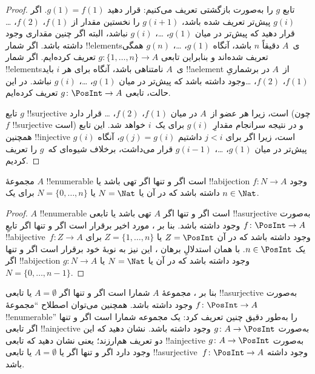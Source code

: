 \documentclass[../../../include/open-logic-section]{subfiles}
\begin{document}
\begin{proof}
  تابع $g$ را به‌صورت بازگشتی تعریف می‌کنیم: قرار دهید $g(1) = f(1)$.
  اگر $g(i)$ پیش‌تر تعریف شده باشد، $g(i+1)$ را نخستین مقدار از $f(1)$،
  $f(2)$، \dots{} قرار دهید که پیش‌تر در میان $g(1)$، \dots، $g(i)$
  نباشد، البته اگر چنین مقداری وجود داشته باشد. اگر شمار !!{element}sی~$A$
  دقیقاً $n$ باشد، آنگاه $g(1)$، \dots، $g(n)$ همگی تعریف شده‌اند
  و بنابراین تابعی $g\colon \{1, \dots, n\}
  \to A$ تعریف کرده‌ایم. اگر شمار !!{element}sی~$A$ نامتناهی باشد، آنگاه برای هر $i$ باید
  !!a{element} از~$A$ در برشماریِ $f(1)$، $f(2)$، \dots وجود داشته باشد
  که پیش‌تر در میان $g(1)$، \dots، $g(i)$ نباشد. در این حالت، تابعی
  $g\colon \PosInt \to A$ تعریف کرده‌ایم.

  تابع $g$ !!{surjective} است، زیرا هر عضو از~$A$ در میان $f(1)$،
  $f(2)$، \dots{} قرار دارد (چون $f$ !!{surjective} است) و در نتیجه سرانجام
  مقدارِ~$g(i)$ برای یک~$i$ خواهد شد. این تابع همچنین !!{injective} است،
  زیرا اگر برای $j < i$ داشتیم $g(j) = g(i)$، آنگاه $g(i)$ پیش‌تر
  در میان $g(1)$، \dots، $g(i-1)$ قرار می‌داشت، برخلاف شیوه‌ای که~$g$
  را تعریف کردیم.
\end{proof}

\begin{cor}
مجموعهٔ $A$ !!{enumerable} است اگر و تنها اگر تهی باشد یا !!a{bijection}
$f\colon N \to A$ وجود داشته باشد که در آن یا $N = \Nat$ یا
$N = \{0, \dots, n\}$ برای یک $n \in \Nat$.
\end{cor}

\begin{proof}
$A$ !!{enumerable} است اگر و تنها اگر $A$ تهی باشد یا تابعی
!!a{surjective} به‌صورت $f\colon \PosInt \to A$ وجود داشته باشد. بنا بر
، مورد اخیر برقرار است اگر و تنها اگر تابعِ
!!a{bijective}~$f\colon Z \to A$ وجود داشته باشد که در آن $Z =
\PosInt$ یا $Z = \{1, \dots, n\}$ برای یک $n \in \PosInt$. با همان
استدلالِ برهان ، این نیز به نوبهٔ خود برقرار است
اگر و تنها اگر !!a{bijection} $g\colon N \to A$ وجود داشته باشد که در آن
یا $N = \Nat$ یا $N = \{0, \dots, n-1\}$.
\end{proof}

\begin{prob}
  بنا بر ، مجموعهٔ $A$ شمارا است
  اگر و تنها اگر $A = \emptyset$ یا تابعی !!a{surjective} به‌صورت $f\colon
  \PosInt \to A$ وجود داشته باشد. همچنین می‌توان اصطلاح
  ``مجموعهٔ !!{enumerable}'' را به‌طور دقیق چنین تعریف کرد: یک مجموعه شمارا
  است اگر و تنها اگر تابعی !!a{injective} به‌صورت
  $g\colon A \to \PosInt$ وجود داشته باشد. نشان دهید که این دو تعریف
  هم‌ارزند؛ یعنی نشان دهید که تابعی !!a{injective} به‌صورت
  $g\colon A \to \PosInt$ وجود دارد اگر و تنها اگر یا $A = \emptyset$
  یا تابعی !!a{surjective}~$f\colon \PosInt \to A$ وجود داشته باشد.
\end{prob}
\end{document}

